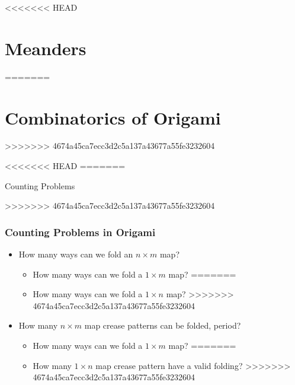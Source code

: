 \documentclass{beamer}
\begin{document}

<<<<<<< HEAD
\section{Meanders}
=======
\section{Combinatorics of Origami}
>>>>>>> 4674a45ca7ecc3d2c5a137a43677a55fe3232604

\newcommand{\R}{\mathsf{R}}
\renewcommand{\L}{\mathsf{L}}

<<<<<<< HEAD
=======
\begin{frame}
	\begin{center}
	\Huge{Counting Problems}
	\end{center}
\end{frame}
>>>>>>> 4674a45ca7ecc3d2c5a137a43677a55fe3232604

\begin{frame}
\frametitle{Counting Problems in Origami}
\begin{itemize}
\item How many ways can we fold an $n\times m$ map?
	\begin{itemize}
<<<<<<< HEAD
	\item How many ways can we fold a $1\times m$ map?
=======
	\item<2-> How many ways can we fold a $1\times n$ map?
>>>>>>> 4674a45ca7ecc3d2c5a137a43677a55fe3232604
	\end{itemize}
\item How many $n\times m$ map crease patterns can be folded, period?
	\begin{itemize}
<<<<<<< HEAD
	\item How many ways can we fold a $1\times m$ map?
=======
	\item<3-> How many $1\times n$ map crease pattern have a valid folding?
>>>>>>> 4674a45ca7ecc3d2c5a137a43677a55fe3232604
	\end{itemize}
\end{itemize}
\end{frame}
\end{document}
